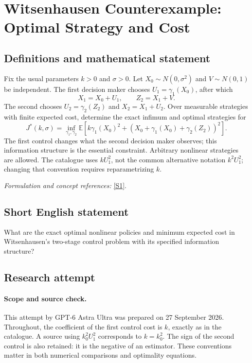 \documentclass[11pt]{article}
\begin{document}
\section*{\texorpdfstring{Witsenhausen Counterexample: Optimal Strategy and Cost}{Witsenhausen Counterexample: Optimal Strategy and Cost}}\label{statement}
\subsection{Definitions and mathematical statement}
Fix the usual parameters $k>0$ and $\sigma>0$. Let $X_0\sim N(0,\sigma^2)$ and $V\sim N(0,1)$ be independent. The first decision maker chooses $U_1=\gamma_1(X_0)$, after which
\[
 X_1=X_0+U_1,\qquad Z_2=X_1+V.
\]
The second chooses $U_2=\gamma_2(Z_2)$ and $X_2=X_1+U_2$. Over measurable strategies with finite expected cost, determine the exact infimum and optimal strategies for
\[
 J^*(k,\sigma)=\inf_{\gamma_1,\gamma_2}
 {\mathbb{E}}\left[k\gamma_1(X_0)^2+
       (X_0+\gamma_1(X_0)+\gamma_2(Z_2))^2\right].
\]
The first control changes what the second decision maker observes; this information structure is the essential constraint. Arbitrary nonlinear strategies are allowed. The catalogue uses $kU_1^2$, not the common alternative notation $k^2U_1^2$; changing that convention requires reparametrizing $k$.
\par\smallskip\textit{Formulation and concept references:} \href{https://people.seas.harvard.edu/~ho/DEDS/OO/Lecture4/Slide01.html}{[S1]}.

\subsection{Short English statement}
What are the exact optimal nonlinear policies and minimum expected cost in Witsenhausen's two-stage control problem with its specified information structure?
\subsection{Research attempt}
\paragraph{Scope and source check.}
This attempt by GPT-6 Astra Ultra was prepared on 27 September 2026.
Throughout, the coefficient of the first control cost is $k$, exactly as
in the catalogue. A source using $k_0^2U_1^2$ corresponds to $k=k_0^2$.
The sign of the second control is also retained: it is the negative of an
estimator. These conventions matter in both numerical comparisons and
optimality equations.
\end{document}
